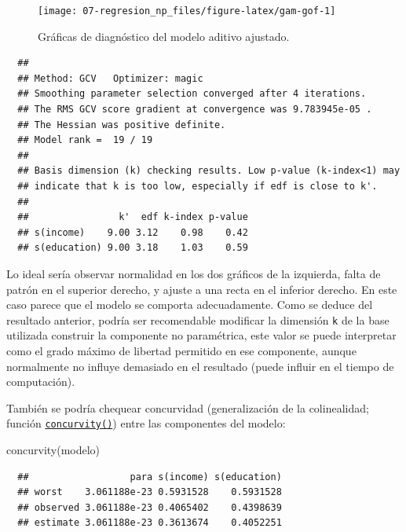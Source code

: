 \documentclass[
]{book}
\newenvironment{Shaded}{\begin{snugshade}}{\end{snugshade}}
\newcommand{\FunctionTok}[1]{\textcolor[rgb]{0.00,0.00,0.00}{#1}}
\newcommand{\NormalTok}[1]{#1}
\theoremstyle{break}
\theoremstyle{nonumberplain}
\begin{document}
\begin{figure}[!htb]

{\centering \texttt{[image: 07-regresion\_np\_files/figure-latex/gam-gof-1]} 

}

\caption{Gráficas de diagnóstico del modelo aditivo ajustado.}\label{fig:gam-gof}
\end{figure}

\begin{verbatim}
  ## 
  ## Method: GCV   Optimizer: magic
  ## Smoothing parameter selection converged after 4 iterations.
  ## The RMS GCV score gradient at convergence was 9.783945e-05 .
  ## The Hessian was positive definite.
  ## Model rank =  19 / 19 
  ## 
  ## Basis dimension (k) checking results. Low p-value (k-index<1) may
  ## indicate that k is too low, especially if edf is close to k'.
  ## 
  ##                k'  edf k-index p-value
  ## s(income)    9.00 3.12    0.98    0.42
  ## s(education) 9.00 3.18    1.03    0.59
\end{verbatim}

Lo ideal sería observar normalidad en los dos gráficos de la izquierda, falta de patrón en el superior derecho, y ajuste a una recta en el inferior derecho. En este caso parece que el modelo se comporta adecuadamente.
Como se deduce del resultado anterior, podría ser recomendable modificar la dimensión \texttt{k} de la base utilizada construir la componente no paramétrica, este valor se puede interpretar como el grado máximo de libertad permitido en ese componente, aunque normalmente no influye demasiado en el resultado (puede influir en el tiempo de computación).

También se podría chequear concurvidad (generalización de la colinealidad; función \href{https://rdrr.io/pkg/mgcv/man/concurvity.html}{\texttt{concurvity()}}) entre las componentes del modelo:

\begin{Shaded}
\begin{Highlighting}[]
\FunctionTok{concurvity}\NormalTok{(modelo)}
\end{Highlighting}
\end{Shaded}

\begin{verbatim}
  ##                  para s(income) s(education)
  ## worst    3.061188e-23 0.5931528    0.5931528
  ## observed 3.061188e-23 0.4065402    0.4398639
  ## estimate 3.061188e-23 0.3613674    0.4052251
\end{verbatim}
\end{document}
